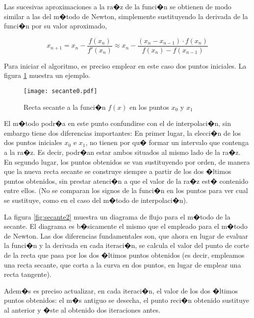 Las sucesivas aproximaciones a la ra�z de la funci�n se obtienen de modo similar a las del m�todo de Newton, simplemente sustituyendo la derivada de la funci�n por su valor aproximado,

\begin{equation*}
x_{n+1}=x_n-\frac{f(x_n)}{f'(x_n)}\approx x_n-\frac{(x_n-x_{n-1})\cdot f(x_n)}{f(x_n)-f(x_{n-1})}
\end{equation*}

Para iniciar el algoritmo, es preciso emplear en este caso dos puntos iniciales. La figura \ref{fig:secante} muestra un ejemplo.

\begin{figure}[h]
\texttt{[image: secante0.pdf]}
\caption{Recta secante a la  funci�n $f(x)$ en los puntos $x_0$ y $x_1$}
\label{fig:secante}
\end{figure}

El m�todo podr�a en este punto confundirse con el de interpolaci�n, sin embargo tiene dos diferencias importantes: En primer lugar, la elecci�n de los dos puntos iniciales $x_0$ e $x_1$, no tienen por qu� formar un intervalo que contenga a la ra�z. Es decir, podr�an estar ambos situados al mismo lado de la ra�z. En segundo lugar, los puntos obtenidos se van sustituyendo por orden, de manera que la nueva recta secante se construye siempre a partir de los dos �ltimos puntos obtenidos, sin prestar atenci�n a que el valor de la ra�z est� contenido entre ellos. (No se comparan los signos de la funci�n en los puntos para ver cual se sustituye, como en el caso del m�todo de interpolaci�n). 

La figura \ref{fig:secante2} muestra un diagrama de flujo para el m�todo de la secante. El diagrama es b�sicamente el mismo que el empleado para el m�todo de Newton. Las dos diferencias fundamentales son, que ahora en lugar de evaluar la funci�n y la derivada en cada iteraci�n, se calcula  el valor del punto de corte de la recta que pasa por los dos �ltimos puntos obtenidos (es decir, empleamos una recta secante, que corta a la curva en dos puntos, en lugar de emplear una recta tangente). 

Adem�s es preciso actualizar, en cada iteraci�n, el valor de los dos �ltimos puntos obtenidos: el m�s antiguo se desecha, el punto reci�n obtenido sustituye al anterior y �ste al obtenido dos iteraciones antes. 

